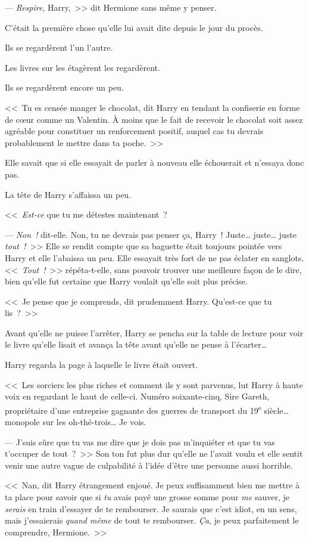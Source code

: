 --- \emph{Respire}, Harry,~>> dit Hermione sans même y penser.

C'était la première chose qu'elle lui avait dite depuis le jour du procès.

Ils se regardèrent l'un l'autre.

Les livres sur les étagèrent les regardèrent.

Ils se regardèrent encore un peu.

<<~Tu es censée manger le chocolat, dit Harry en tendant la confiserie en forme de cœur comme un Valentin. À moins que le fait de recevoir le chocolat soit assez agréable pour constituer un renforcement positif, auquel cas tu devrais probablement le mettre dans ta poche.~>>

Elle savait que si elle essayait de parler à nouveau elle échouerait et n'essaya donc pas.

La tête de Harry s'affaissa un peu.

<<~\emph{Est-ce} que tu me détestes maintenant~?

--- \emph{Non~!} dit-elle. Non, tu ne devrais pas penser ça, Harry~! Juste… juste… juste \emph{tout~!}~>> Elle se rendit compte que sa baguette était toujours pointée vers Harry et elle l'abaissa un peu. Elle essayait très fort de ne pas éclater en sanglots. <<~\emph{Tout~!}~>> répéta-t-elle, sans pouvoir trouver une meilleure façon de le dire, bien qu'elle fut certaine que Harry voulait qu'elle soit plus précise.

<<~Je pense que je comprends, dit prudemment Harry. Qu'est-ce que tu lis~?~>>

Avant qu'elle ne puisse l'arrêter, Harry se pencha sur la table de lecture pour voir le livre qu'elle lisait et avança la tête avant qu'elle ne pense à l'écarter…

Harry regarda la page à laquelle le livre était ouvert.

<<~Les sorciers les plus riches et comment ils y sont parvenus, lut Harry à haute voix en regardant le haut de celle-ci. Numéro soixante-cinq, Sire Gareth, propriétaire d'une entreprise gagnante des guerres de transport du 19\textsuperscript{e} siècle… monopole sur les oh-thé-trois… Je vois.

--- J'suis sûre que tu vas me dire que je dois pas m'inquiéter et que tu vas t'occuper de tout~?~>> Son ton fut plus dur qu'elle ne l'avait voulu et elle sentit venir une autre vague de culpabilité à l'idée d'être une personne aussi horrible.

<<~Nan, dit Harry étrangement enjoué. Je peux suffisamment bien me mettre à ta place pour savoir que si \emph{tu} avais payé une grosse somme pour \emph{me} sauver, je \emph{serais} en train d'essayer de te rembourser. Je saurais que c'est idiot, en un sens, mais j'essaierais \emph{quand même} de tout te rembourser. \emph{Ça}, je peux parfaitement le comprendre, Hermione.~>>

